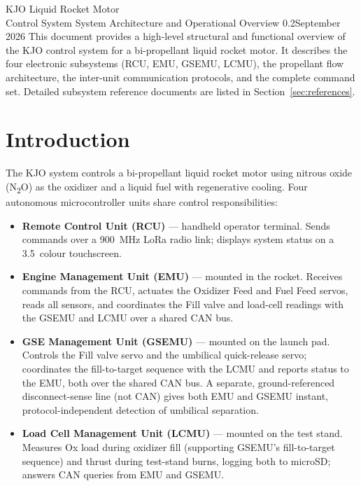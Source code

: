\documentclass[11pt,letterpaper]{article}
\newcommand{\docversion}{0.2}
\newcommand{\docdate}{September 2026}
\begin{document}


\KJOtitlepage%
  {KJO Liquid Rocket Motor\\Control System}%
  {System Architecture and Operational Overview}%
  {\docversion}{\docdate}%
  {This document provides a high-level structural and functional overview of the
   KJO control system for a bi-propellant liquid rocket motor.  It describes the
   four electronic subsystems (RCU, EMU, GSEMU, LCMU), the propellant flow
   architecture, the inter-unit communication protocols, and the complete
   command set.  Detailed subsystem reference documents are listed in
   Section~\ref{sec:references}.}

\tableofcontents
\newpage

\section{Introduction}

The KJO system controls a bi-propellant liquid rocket motor using nitrous oxide
(N\textsubscript{2}O) as the oxidizer and a liquid fuel with regenerative
cooling.  Four autonomous microcontroller units share control responsibilities:

\begin{itemize}[nosep]
  \item \textbf{Remote Control Unit (RCU)} --- handheld operator terminal.
        Sends commands over a 900~MHz LoRa radio link; displays system status
        on a 3.5\textquotedbl\ colour touchscreen.
  \item \textbf{Engine Management Unit (EMU)} --- mounted in the rocket.
        Receives commands from the RCU, actuates the Oxidizer Feed and Fuel Feed
        servos, reads all sensors, and coordinates the Fill valve and load-cell
        readings with the GSEMU and LCMU over a shared CAN bus.
  \item \textbf{GSE Management Unit (GSEMU)} --- mounted on the launch pad.
        Controls the Fill valve servo and the umbilical quick-release servo;
        coordinates the fill-to-target sequence with the LCMU and reports
        status to the EMU, both over the shared CAN bus. A separate,
        ground-referenced disconnect-sense line (not CAN) gives both EMU and
        GSEMU instant, protocol-independent detection of umbilical separation.
  \item \textbf{Load Cell Management Unit (LCMU)} --- mounted on the test
        stand. Measures Ox load during oxidizer fill (supporting GSEMU's
        fill-to-target sequence) and thrust during test-stand burns, logging
        both to microSD; answers CAN queries from EMU and GSEMU.
\end{itemize}
\end{document}
